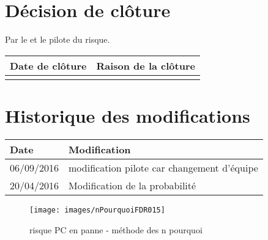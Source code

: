\section*{Décision de clôture}
Par le \CP{} et le pilote du risque.
\begin{table}[H]
\centering
	\begin{tabularx}{16.8cm}{|X|X|}
	\hline
	\rowcolor{gray!40} Date de clôture & Raison de la clôture \\
	\hline
	  & \\
	\hline
	\end{tabularx}
\end{table}

\section*{Historique des modifications}
\begin{table}[H]
\centering
	\begin{tabularx}{16.8cm}{|X|X|}
	\hline
	\rowcolor{gray!40} Date & Modification \\
	\hline
	 06/09/2016 & modification pilote car changement d'équipe \\
	\hline
	 20/04/2016 & Modification de la probabilité \\
	\hline
	\end{tabularx}
\end{table}
\newpage


\begin{figure}
	\centering
	\texttt{[image: images/nPourquoiFDR015]}
	\caption{\label{PC en panne}risque PC en panne - méthode des n pourquoi}
\end{figure}